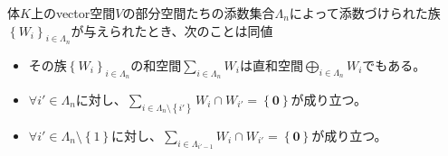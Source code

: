 \documentclass[dvipdfmx]{jsarticle}
\begin{document}
\begin{thm}\label{2.2.1.2}
体$K$上のvector空間$V$の部分空間たちの添数集合$\varLambda_{n}$によって添数づけられた族$\left\{ W_{i} \right\}_{i \in \varLambda_{n}}$が与えられたとき、次のことは同値
\begin{itemize}
\item
  その族$\left\{ W_{i} \right\}_{i \in \varLambda_{n}}$の和空間$\sum_{i \in \varLambda_{n}} W_{i}$は直和空間$\bigoplus_{i \in \varLambda_{n}} W_{i}$でもある。
\item
  $\forall i' \in \varLambda_{n}$に対し、$\sum_{i \in \varLambda_{n} \setminus \left\{ i' \right\}} W_{i} \cap W_{i'} = \left\{ \mathbf{0} \right\}$が成り立つ。
\item
  $\forall i' \in \varLambda_{n} \setminus \left\{ 1 \right\}$に対し、$\sum_{i \in \varLambda_{i' - 1}} W_{i} \cap W_{i'} = \left\{ \mathbf{0} \right\}$が成り立つ。
\end{itemize}
\end{thm}
\end{document}
